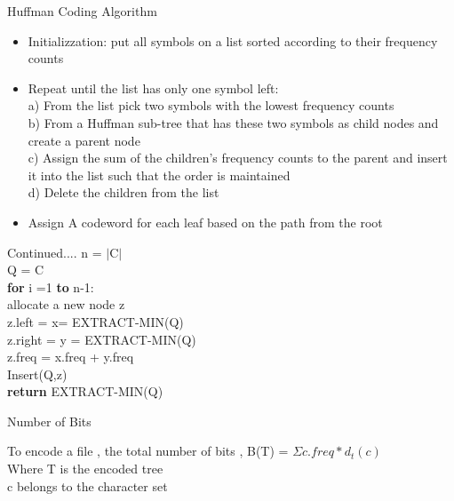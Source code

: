 \documentclass[12pt]{beamer}
\begin{document}
\begin{frame} {Huffman Coding Algorithm}
   \begin{itemize}
   	\item Initializzation: put all symbols on a list sorted according to their frequency counts
    \item Repeat until the list has only one symbol left:\\
		
			a) From the list pick two symbols with the lowest frequency counts\\
   			b) From a Huffman sub-tree that has these two symbols as child nodes and create a parent node\\ 
   			c) Assign the sum of the children's frequency counts to the parent and insert it into the list 					   such that the order is maintained\\
   			d) Delete the children from the list\\
        
   		
   	\item Assign A codeword for each leaf based on the path from the root  
   \end{itemize}
\end{frame}


\begin{frame} {Continued....}
     n = $|$C$|$ \\
     Q = C\\
     \textbf{for} i =1 \textbf{to} n-1:\\
     
     	\qquad 	 allocate a new node z\\
     	\qquad 	 z.left = x= EXTRACT-MIN(Q)\\
     	\qquad 	 z.right = y = EXTRACT-MIN(Q)\\
     	\qquad 	 z.freq = x.freq + y.freq\\
     	\qquad 	 Insert(Q,z)\\
     \textbf{return}  EXTRACT-MIN(Q)
\end{frame}


\begin{frame} {Number of Bits}

	 To encode a file , the total number of bits , B(T) = $ \Sigma c.freq * d_{t}(c) $  \\
	 
	 Where T is the encoded tree\\
	 c belongs to the character set


\end{frame}
\end{document}
